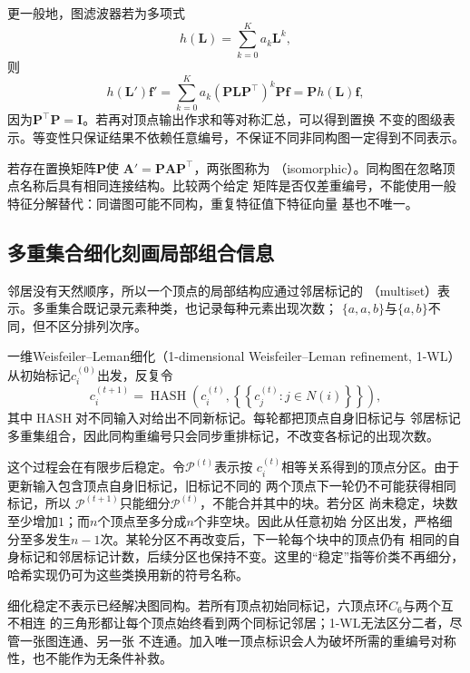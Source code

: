更一般地，图滤波器若为多项式
\begin{equation}
  h(\bm{L})=\sum_{k=0}^{K}a_k\bm{L}^k,
  \label{eq:graph-theory-polynomial-filter}
\end{equation}
则
\[
  h(\bm{L}')\bm{f}'
  =\sum_{k=0}^{K}a_k(\bm{P}\bm{L}\bm{P}^{\top})^k\bm{P}\bm{f}
  =\bm{P}h(\bm{L})\bm{f},
\]
因为\(\bm{P}^{\top}\bm{P}=\bm{I}\)。若再对顶点输出作求和等对称汇总，可以得到置换
不变的图级表示。等变性只保证结果不依赖任意编号，不保证不同非同构图一定得到不同表示。

若存在置换矩阵\(\bm{P}\)使
\(\bm{A}'=\bm{P}\bm{A}\bm{P}^{\top}\)，两张图称为
（isomorphic）。同构图在忽略顶点名称后具有相同连接结构。比较两个给定
矩阵是否仅差重编号，不能使用一般特征分解替代：同谱图可能不同构，重复特征值下特征向量
基也不唯一。

\subsection{多重集合细化刻画局部组合信息}

邻居没有天然顺序，所以一个顶点的局部结构应通过邻居标记的
（multiset）表示。多重集合既记录元素种类，也记录每种元素出现次数；
\(\{a,a,b\}\)与\(\{a,b\}\)不同，但不区分排列次序。

一维Weisfeiler--Leman细化（1-dimensional Weisfeiler--Leman refinement,
1-WL）从初始标记\(c_i^{(0)}\)出发，反复令
\begin{equation}
  c_i^{(t+1)}=\operatorname{HASH}\left(
    c_i^{(t)},
    \left\{\!\left\{
      c_j^{(t)}:j\in N(i)
    \right\}\!\right\}
  \right),
  \label{eq:graph-theory-wl-refinement}
\end{equation}
其中\(\operatorname{HASH}\)对不同输入对给出不同新标记。每轮都把顶点自身旧标记与
邻居标记多重集组合，因此同构重编号只会同步重排标记，不改变各标记的出现次数。

这个过程会在有限步后稳定。令\(\mathcal{P}^{(t)}\)表示按
\(c_i^{(t)}\)相等关系得到的顶点分区。由于更新输入包含顶点自身旧标记，旧标记不同的
两个顶点下一轮仍不可能获得相同标记，所以
\(\mathcal{P}^{(t+1)}\)只能细分\(\mathcal{P}^{(t)}\)，不能合并其中的块。若分区
尚未稳定，块数至少增加\(1\)；而\(n\)个顶点至多分成\(n\)个非空块。因此从任意初始
分区出发，严格细分至多发生\(n-1\)次。某轮分区不再改变后，下一轮每个块中的顶点仍有
相同的自身标记和邻居标记计数，后续分区也保持不变。这里的“稳定”指等价类不再细分，
哈希实现仍可为这些类换用新的符号名称。

细化稳定不表示已经解决图同构。若所有顶点初始同标记，六顶点环\(C_6\)与两个互不相连
的三角形都让每个顶点始终看到两个同标记邻居；1-WL无法区分二者，尽管一张图连通、另一张
不连通。加入唯一顶点标识会人为破坏所需的重编号对称性，也不能作为无条件补救。

